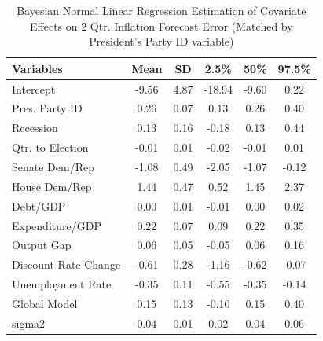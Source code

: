 \documentclass[a4paper]{article}\usepackage{graphicx, color}
\begin{document}
\begin{table}[ht]
\begin{center}
\caption{Bayesian Normal Linear Regression Estimation of Covariate Effects on 2 Qtr. Inflation Forecast Error (Matched by President's Party ID variable)}
\label{OutputPB}
{\small
\begin{tabular}{lccccc}
  \hline
Variables & Mean & SD & 2.5\% & 50\% & 97.5\% \\ 
  \hline
Intercept & -9.56 & 4.87 & -18.94 & -9.60 & 0.22 \\ 
  Pres. Party ID & 0.26 & 0.07 & 0.13 & 0.26 & 0.40 \\ 
  Recession & 0.13 & 0.16 & -0.18 & 0.13 & 0.44 \\ 
  Qtr. to Election & -0.01 & 0.01 & -0.02 & -0.01 & 0.01 \\ 
  Senate Dem/Rep & -1.08 & 0.49 & -2.05 & -1.07 & -0.12 \\ 
  House Dem/Rep & 1.44 & 0.47 & 0.52 & 1.45 & 2.37 \\ 
  Debt/GDP & 0.00 & 0.01 & -0.01 & 0.00 & 0.02 \\ 
  Expenditure/GDP & 0.22 & 0.07 & 0.09 & 0.22 & 0.35 \\ 
  Output Gap & 0.06 & 0.05 & -0.05 & 0.06 & 0.16 \\ 
  Discount Rate Change & -0.61 & 0.28 & -1.16 & -0.62 & -0.07 \\ 
  Unemployment Rate & -0.35 & 0.11 & -0.55 & -0.35 & -0.14 \\ 
  Global Model & 0.15 & 0.13 & -0.10 & 0.15 & 0.40 \\ 
  sigma2 & 0.04 & 0.01 & 0.02 & 0.04 & 0.06 \\ 
   \hline
\end{tabular}
}
\end{center}
\end{table}





\end{document}
